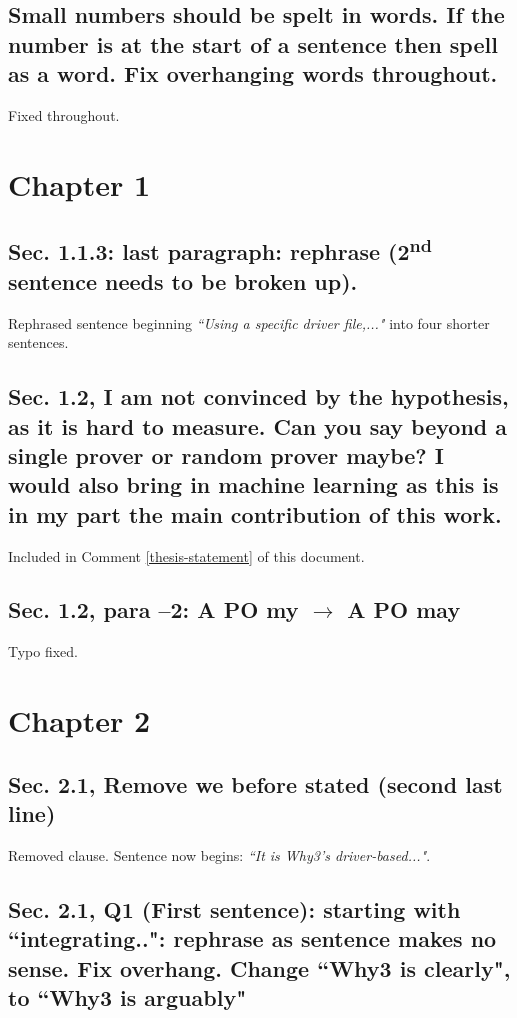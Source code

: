 \documentclass[]{article}
\newcommand{\ts}{\textsuperscript}
\begin{document}
\subsection{Small numbers should be spelt in words. If the number is at the start of a sentence then spell as a word. Fix overhanging words throughout.}
\label{overhang-numbers}
Fixed throughout.

\section{Chapter 1}

\subsection{Sec. 1.1.3: last paragraph: rephrase (2\ts{nd} sentence needs to be broken up).}

Rephrased sentence beginning \emph{``Using a specific driver file,..."} into four shorter sentences.

\subsection{Sec. 1.2, I am not convinced by the hypothesis, as it is hard to measure. Can you say beyond a single prover or random prover maybe? I would also bring in machine learning as this is in my part the main contribution of this work.}

Included in Comment \ref{thesis-statement} of this document.

\subsection{Sec. 1.2, para –2: A PO my $\rightarrow$ A PO may}

Typo fixed.

\section{Chapter 2}

\subsection{Sec. 2.1, Remove we before stated (second last line)}

Removed clause. Sentence now begins: \emph{``It is \textsf{Why3}'s driver-based..."}.

\subsection{Sec. 2.1, Q1 (First sentence): starting with ``integrating..": rephrase as sentence makes no sense. Fix overhang. Change ``Why3 is clearly", to ``Why3 is arguably"}
\end{document}
